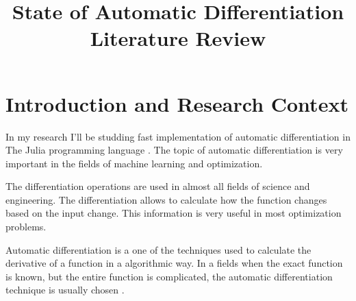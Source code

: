 \documentclass[conference,a4paper]{IEEEtran}
\begin{document}
\title{State of Automatic Differentiation\\ Literature Review}

\author{
}

\maketitle


\section{Introduction and Research Context}

In my research I'll be studding fast implementation of automatic differentiation in The Julia programming language \cite{JuliaLanguage:Homepage}.
The topic of automatic differentiation is very important in the fields of machine learning and optimization.

The differentiation operations are used in almost all fields of science and engineering.
The differentiation allows to calculate how the function changes based on the input change.
This information is very useful in most optimization problems.

Automatic differentiation is a one of the techniques used to calculate the derivative of a function in a algorithmic way.
In a fields when the exact function is known, but the entire function is complicated, the automatic differentiation technique is usually chosen \cite{baydin2018automatic}.
\end{document}
